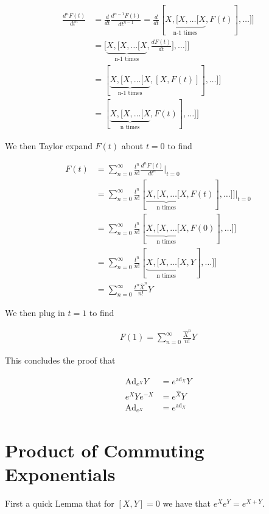 \documentclass[12pt]{article}
\newcommand{\ddt}[1]{\frac{d #1}{dt}}
\begin{document}
\begin{align}
\frac{d^nF(t)}{dt^n} &= \ddt{} \frac{d^{n-1}F(t)}{dt^{n-1}} = \ddt{} [\underbrace{X,[X,\ldots[X}_{\text{n-1 times}},F(t)],\ldots]]\\
&= \Big[\underbrace{X,\Big[X,\ldots\Big[X}_{\text{n-1 times}},\ddt{F(t)}\Big],\ldots\Big]\Big]\\
&= [\underbrace{X,[X,\ldots[X}_{\text{n-1 times}},[X,F(t)]],\ldots]]\\
&= [\underbrace{X,[X,\ldots[X}_{\text{n times}},F(t)],\ldots]]
\end{align}

We then Taylor expand $F(t)$ about $t=0$ to find

\begin{align}
F(t) &= \sum_{n=0}^{\infty} \frac{t^n}{n!} \frac{d^nF(t)}{dt^n}\Bigg|_{t=0}\\
&= \sum_{n=0}^{\infty} \frac{t^n}{n!} [\underbrace{X,[X,\ldots[X}_{\text{n times}},F(t)],\ldots]]\Bigg|_{t=0}\\
&=\sum_{n=0}^{\infty} \frac{t^n}{n!} [\underbrace{X,[X,\ldots[X}_{\text{n times}},F(0)],\ldots]]\\
&=\sum_{n=0}^{\infty} \frac{t^n}{n!} [\underbrace{X,[X,\ldots[X}_{\text{n times}},Y],\ldots]]\\
&=\sum_{n=0}^{\infty} \frac{t^n\hat{X}^n}{n!} Y 
\end{align}

We then plug in $t=1$ to find

\begin{align}
F(1) = \sum_{n=0}^{\infty} \frac{\hat{X}^n}{n!} Y
\end{align}

This concludes the proof that

\begin{equation}
\begin{aligned}
\text{Ad}_{e^X} Y &= e^{\text{ad}_X} Y\\
e^X Y e^{-X} &= e^{\hat{X}} Y\\
\text{Ad}_{e^X} &= e^{\text{ad}_X}
\end{aligned}
\end{equation}


\section{Product of Commuting Exponentials}

First a quick Lemma that for $[X,Y]=0$ we have that $e^{X}e^{Y} = e^{X+Y}$.
\end{document}
